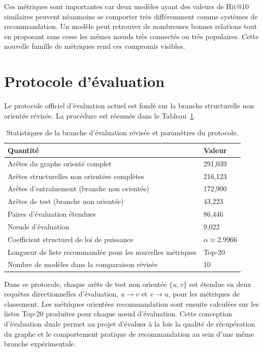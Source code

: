 Ces métriques sont importantes car deux modèles ayant des valeurs de Hit@10
similaires peuvent néanmoins se comporter très différemment comme systèmes de
recommandation. Un modèle peut retrouver de nombreuses bonnes relations tout en
proposant sans cesse les mêmes nœuds très connectés ou très populaires. Cette
nouvelle famille de métriques rend ces compromis visibles.

\section{Protocole d'évaluation}

Le protocole officiel d'évaluation actuel est fondé sur la branche structurelle
non orientée révisée. La procédure est résumée dans le
Tableau~\ref{tab:eval-branch-stats}.

\begin{table}[H]
\centering
\caption{Statistiques de la branche d'évaluation révisée et paramètres du protocole.}
\label{tab:eval-branch-stats}
\begin{tabular}{p{}p{}}
\toprule
\textbf{Quantité} & \textbf{Valeur} \\
\midrule
Arêtes du graphe orienté complet & 291,039 \\
Arêtes structurelles non orientées complètes & 216,123 \\
Arêtes d'entraînement (branche non orientée) & 172,900 \\
Arêtes de test (branche non orientée) & 43,223 \\
Paires d'évaluation étendues & 86,446 \\
Nœuds d'évaluation & 9,022 \\
Coefficient structurel de loi de puissance & $\alpha \approx 2.9966$ \\
Longueur de liste recommandée pour les nouvelles métriques & Top-20 \\
Nombre de modèles dans la comparaison révisée & 10 \\
\bottomrule
\end{tabular}
\end{table}

Dans ce protocole, chaque arête de test non orientée $\{u,v\}$ est étendue en
deux requêtes directionnelles d'évaluation, $u \rightarrow v$ et $v \rightarrow u$,
pour les métriques de classement. Les métriques orientées recommandation sont
ensuite calculées sur les listes Top-20 produites pour chaque nœud
d'évaluation. Cette conception d'évaluation duale permet au projet d'évaluer
à la fois la qualité de récupération du graphe et le comportement pratique de
recommandation au sein d'une même branche expérimentale.
